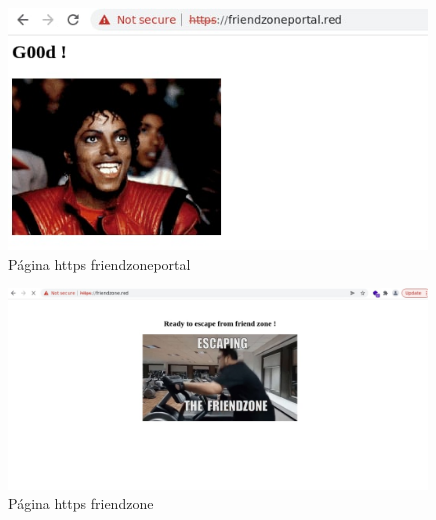        \begin{figure}[H]
            \centering
            \includegraphics[width=0.99\textwidth]{informe4/imagenes/friendzone/09_https_friendzoneportal.png}
            \caption{Página https friendzoneportal} 
        \end{figure}

        \begin{figure}[H]
            \centering
            \includegraphics[width=0.99\textwidth]{informe4/imagenes/friendzone/10_https_friendzone.png}
            \caption{Página https friendzone} 
        \end{figure}

